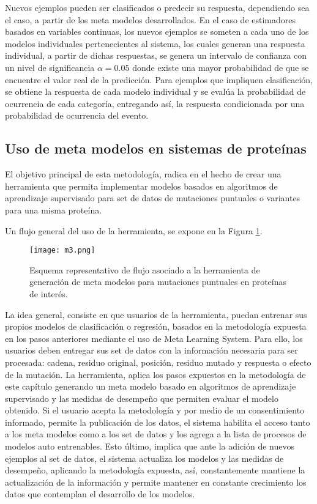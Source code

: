 Nuevos ejemplos pueden ser clasificados o predecir su respuesta, dependiendo sea el caso, a partir de los meta modelos desarrollados. En el caso de estimadores basados en variables continuas, los nuevos ejemplos se someten a cada uno de los modelos individuales pertenecientes al sistema, los cuales generan una respuesta individual, a partir de dichas respuestas, se genera un intervalo de confianza con un nivel de significancia $\alpha=0.05$ donde existe una mayor probabilidad de que se encuentre el valor real de la predicción. Para ejemplos que impliquen clasificación, se obtiene la respuesta de cada modelo individual y se evalúa la probabilidad de ocurrencia de cada categoría, entregando así, la respuesta condicionada por una probabilidad de ocurrencia del evento.

\subsection{Uso de meta modelos en sistemas de proteínas}

El objetivo principal de esta metodología, radica en el hecho de crear una herramienta que permita implementar modelos basados en algoritmos de aprendizaje supervisado para set de datos de mutaciones puntuales o variantes para una misma proteína. 

Un flujo general del uso de la herramienta, se expone en la Figura \ref{C2:M3}.

\begin{figure}[!h]
	\centering
	\texttt{[image: m3.png]}
	\caption{Esquema representativo de flujo asociado a la herramienta de generación de meta modelos para mutaciones puntuales en proteínas de interés.}
	\label{C2:M3}
\end{figure}

La idea general, consiste en que usuarios de la herramienta, puedan entrenar sus propios modelos de clasificación o regresión, basados en la metodología expuesta en los pasos anteriores mediante el uso de Meta Learning System. Para ello, los usuarios deben entregar sus set de datos con la información necesaria para ser procesada: cadena, residuo original, posición, residuo mutado y respuesta o efecto de la mutación. La herramienta, aplica los pasos expuestos en la metodología de este capítulo generando un meta modelo basado en algoritmos de aprendizaje supervisado y las medidas de desempeño que permiten evaluar el modelo obtenido. Si el usuario acepta la metodología y por medio de un consentimiento informado, permite la publicación de los datos, el sistema habilita el acceso tanto a los meta modelos como a los set de datos y los agrega a la lista de procesos de modelos auto entrenables. Esto último, implica que ante la adición de nuevos ejemplos al set de datos, el sistema actualiza los modelos y las medidas de desempeño, aplicando la metodología expuesta, así, constantemente mantiene la actualización de la información y permite mantener en constante crecimiento los datos que contemplan el desarrollo de los modelos.


